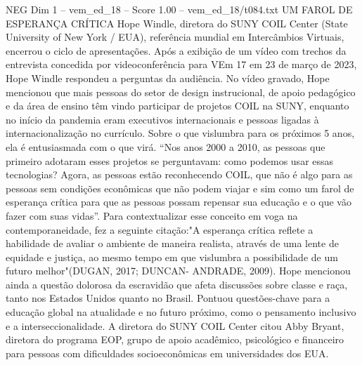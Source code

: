 \begin{textsample}{NEG Dim 1 – vem\_ed\_18 – Score 1.00 – vem\_ed\_18/t084.txt}  \label{ex:f1_neg_061}
UM FAROL DE ESPERANÇA CRÍTICA Hope Windle, diretora do SUNY COIL Center (State University of New York / EUA), referência mundial em Intercâmbios Virtuais, encerrou o ciclo de apresentações.
Após a exibição de um vídeo com trechos da entrevista concedida por videoconferência para VEm 17 em 23 de março de 2023, Hope Windle respondeu a perguntas da audiência.
No vídeo gravado, Hope mencionou que mais pessoas do setor de design instrucional, de apoio pedagógico e da área de ensino têm vindo participar de projetos COIL na SUNY, enquanto no início da pandemia eram executivos internacionais e pessoas ligadas à internacionalização no currículo.
Sobre o que vislumbra para os próximos 5 anos, ela é entusiasmada com o que virá. “Nos anos 2000 a 2010, as pessoas que primeiro adotaram esses projetos se perguntavam: como podemos usar essas tecnologias?
Agora, as pessoas estão reconhecendo COIL, que não é algo para as pessoas sem condições econômicas que não podem viajar e sim como um farol de esperança crítica para que as pessoas possam repensar sua educação e o que vão fazer com suas vidas”.
Para contextualizar esse conceito em voga na contemporaneidade, fez a seguinte citação:"A esperança crítica reflete a habilidade de avaliar o ambiente de maneira realista, através de uma lente de equidade e justiça, ao mesmo tempo em que vislumbra a possibilidade de um futuro melhor"(DUGAN, 2017; DUNCAN- ANDRADE, 2009).
Hope mencionou ainda a questão dolorosa da escravidão que afeta discussões sobre classe e raça, tanto nos Estados Unidos quanto no Brasil.
Pontuou questões-chave para a educação global na atualidade e no futuro próximo, como o pensamento inclusivo e a interseccionalidade.
A diretora do SUNY COIL Center citou Abby Bryant, diretora do programa EOP, grupo de apoio acadêmico, psicológico e financeiro para pessoas com dificuldades socioeconômicas em universidades dos EUA.

\end{textsample}
